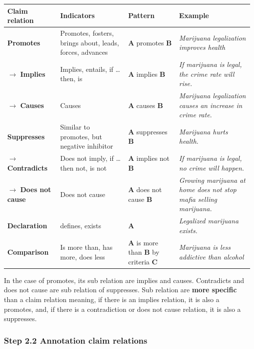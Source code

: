 \begin{table}[h!]
\begin{tabular}{| l | p{3.5cm} | p{3cm} | p{5cm}| }
\hline
\cellcolor{gray!25} Claim relation & \cellcolor{gray!25}Indicators &
\cellcolor{gray!25} Pattern & \cellcolor{gray!25}Example \\
\hline
	\textbf{Promotes} & 
	Promotes, fosters, brings about, leads, forces, advances & 
	\textbf{A} promotes \textbf{B} &
\textit{Marijuana legalization improves health} \\
\hline
	$\rightarrow$ \textbf{Implies} & 
	Implies, entails, if \dots then, is &
	\textbf{A} implies \textbf{B} &
\textit{If marijuana is legal, the crime rate will rise. } \\
\hline
	$\rightarrow$ \textbf{Causes} &
	Causes &
	\textbf{A} causes \textbf{B} &
\textit{Marijuana legalization causes an increase in crime rate.} \\
\hline
	\textbf{Suppresses} &
	Similar to promotes, but negative inhibitor &
	\textbf{A} suppresses \textbf{B} &
	\textit{ Marijuana hurts health. } \\
	\hline
	$\rightarrow$ \textbf{Contradicts} &
	Does not imply, if \dots then not, is not &
	\textbf{A} implies not \textbf{B} &
\textit{If marijuana is legal, no crime will happen. } \\
\hline
	$\rightarrow$ \textbf{Does not cause} &
	Does not cause &
	\textbf{A} does not cause \textbf{B} &
\textit{Growing marijuana at home does not stop mafia selling marijuana. } \\
\hline
	\textbf{Declaration} &
	defines, exists &
	\textbf{A} &
\textit{Legalized marijuana exists.} \\
\hline
	\textbf{Comparison} & 
	Is more than, has more, does less &
	\textbf{A} is more than \textbf{B} by criteria \textbf{C} &
\textit{Marijuana is less addictive than alcohol} \\
\hline
\end{tabular}
\end{table}

In the case of promotes, its sub relation are implies and causes. Contradicts
and does not cause are sub relation of suppresses. Sub relation are \textbf{more specific}
than a claim relation meaning, if there is an implies relation, it is also a
promotes, and, if there is a contradiction or does not cause relation, it is
also a suppresses. 

\subsubsection*{Step 2.2 Annotation claim relations}

